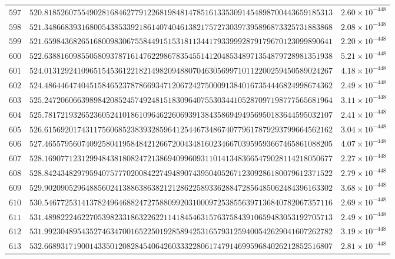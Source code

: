 \documentclass[12pt,reqno]{amsart}
\theoremstyle{remark}
\begin{document}
\begin{longtable}{clc}
$597$ & $520.8185260755490281684627791226819848147851613353091454898700443659185313$ & $2.60\times 10^{-448}$ \\
$598$ & $521.3486683931680054385339218614074046138217572730397395896873325731883868$ & $2.08\times 10^{-448}$ \\
$599$ & $521.6598436826516800983067558449151531811344179339992879179670123099890641$ & $2.20\times 10^{-448}$ \\
$600$ & $522.6388160985505809378716147622986783545514120485348971354879728981351938$ & $5.21\times 10^{-448}$ \\
$601$ & $524.0131292410965154536122182149820948807046305699710112200259450589024267$ & $4.18\times 10^{-448}$ \\
$602$ & $524.4864464740451584652378786693471206724275000913840167354446824998674362$ & $2.49\times 10^{-448}$ \\
$603$ & $525.2472060663989842085245749248151830964075530344105287097198777565681964$ & $3.11\times 10^{-448}$ \\
$604$ & $525.7817219326523605241018610964622606939138435869494956950183644595032107$ & $2.41\times 10^{-448}$ \\
$605$ & $526.6156920174311756068523839328596412544673486740779617879293799664562162$ & $3.04\times 10^{-448}$ \\
$606$ & $527.4655795607409258041958484212667200434816023466703959593667465861088205$ & $4.07\times 10^{-448}$ \\
$607$ & $528.1690771231299484381808247213869409960931101413483665479028114218050677$ & $2.27\times 10^{-448}$ \\
$608$ & $528.8424348297959407577702008422749489074395040526712309286180079612371522$ & $2.79\times 10^{-448}$ \\
$609$ & $529.9020905296488560241388638638212128622589336288472856485062484396163302$ & $3.68\times 10^{-448}$ \\
$610$ & $530.5467725314137824964688247275880992031000972538556397136840782067357116$ & $2.69\times 10^{-448}$ \\
$611$ & $531.4898222462270539823318632262211418454631576375843910659483053192705713$ & $2.49\times 10^{-448}$ \\
$612$ & $531.9923048954352746347001652250192858942531657931259400542629041607262782$ & $3.19\times 10^{-448}$ \\
$613$ & $532.6689317190014335012082845406426033322806174791469959684026212852516807$ & $2.81\times 10^{-448}$ \\

\end{longtable}
\end{document}

